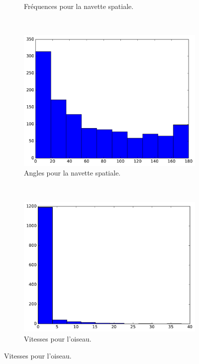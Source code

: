 \begin{figure}
\begin{subfigure}[t]{\subImgWaStats}
			\caption{Fréquences pour la navette spatiale.}
			\label{fig:spaceA_frequency}
		\end{subfigure}
		~
		\begin{subfigure}[t]{\subImgWaStats}
			\centering
			\includegraphics[width=\textwidth]{figures/ch3/spaceA_angle}
			\caption{Angles pour la navette spatiale.}
			\label{fig:spaceA_angle}
		\end{subfigure}
		~
		\begin{subfigure}[t]{\subImgWaStats}
			\centering
			\includegraphics[width=\textwidth]{figures/ch3/oiseau_speed}
			\caption{Vitesses pour l'oiseau.}
			\label{fig:oiseau_speed}
		\end{subfigure}

\end{figure}

